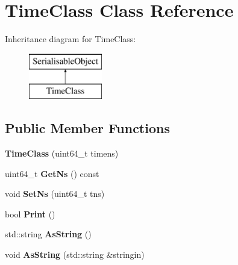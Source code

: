 \hypertarget{classTimeClass}{\section{Time\-Class Class Reference}
\label{classTimeClass}
}
Inheritance diagram for Time\-Class\-:\begin{figure}[H]
\begin{center}
\leavevmode
\includegraphics[height=2.000000cm]{classTimeClass}
\end{center}
\end{figure}
\subsection*{Public Member Functions}
\begin{DoxyCompactItemize}
\item 
\hypertarget{classTimeClass_aa7437c7a5bb6fa3c5e9e568130b833ba}{{\bfseries Time\-Class} (uint64\-\_\-t timens)}\label{classTimeClass_aa7437c7a5bb6fa3c5e9e568130b833ba}

\item 
\hypertarget{classTimeClass_abdd3dc5e2c01b4cb82ec9e892cfdff48}{uint64\-\_\-t {\bfseries Get\-Ns} () const }\label{classTimeClass_abdd3dc5e2c01b4cb82ec9e892cfdff48}

\item 
\hypertarget{classTimeClass_ab50e4e660c43ad375648db1a9748ef09}{void {\bfseries Set\-Ns} (uint64\-\_\-t tns)}\label{classTimeClass_ab50e4e660c43ad375648db1a9748ef09}

\item 
\hypertarget{classTimeClass_a06335343185dbcb0555eb17b994b3c50}{bool {\bfseries Print} ()}\label{classTimeClass_a06335343185dbcb0555eb17b994b3c50}

\item 
\hypertarget{classTimeClass_a58638d323e604591ecb80b83bafe9aee}{std\-::string {\bfseries As\-String} ()}\label{classTimeClass_a58638d323e604591ecb80b83bafe9aee}

\item 
\hypertarget{classTimeClass_a541674ea6b43f30fad16fc4a04a36c37}{void {\bfseries As\-String} (std\-::string \&stringin)}\label{classTimeClass_a541674ea6b43f30fad16fc4a04a36c37}

\end{DoxyCompactItemize}
